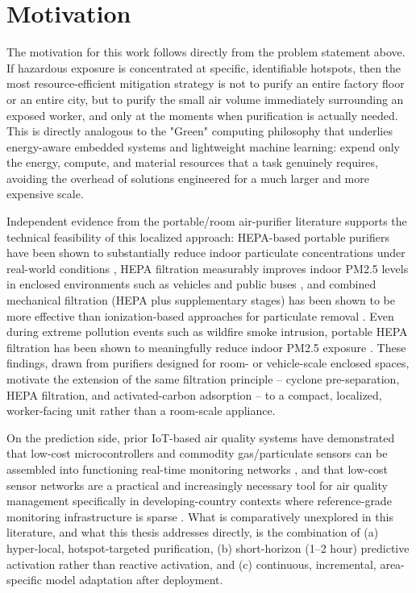 \section{Motivation}
\label{sec:motivation}

The motivation for this work follows directly from the problem statement above. If hazardous exposure is concentrated at specific, identifiable hotspots, then the most resource-efficient mitigation strategy is not to purify an entire factory floor or an entire city, but to purify the small air volume immediately surrounding an exposed worker, and only at the moments when purification is actually needed. This is directly analogous to the "Green" computing philosophy that underlies energy-aware embedded systems and lightweight machine learning: expend only the energy, compute, and material resources that a task genuinely requires, avoiding the overhead of solutions engineered for a much larger and more expensive scale.

Independent evidence from the portable/room air-purifier literature supports the technical feasibility of this localized approach: HEPA-based portable purifiers have been shown to substantially reduce indoor particulate concentrations under real-world conditions \citep{lu2023realworld,cox2018effectiveness}, HEPA filtration measurably improves indoor PM2.5 levels in enclosed environments such as vehicles and public buses \citep{lee2022effect,chen2022efficacy}, and combined mechanical filtration (HEPA plus supplementary stages) has been shown to be more effective than ionization-based approaches for particulate removal \citep{dubey2021assessing,szczotko2022review}. Even during extreme pollution events such as wildfire smoke intrusion, portable HEPA filtration has been shown to meaningfully reduce indoor PM2.5 exposure \citep{chen2025fine}. These findings, drawn from purifiers designed for room- or vehicle-scale enclosed spaces, motivate the extension of the same filtration principle -- cyclone pre-separation, HEPA filtration, and activated-carbon adsorption -- to a compact, localized, worker-facing unit rather than a room-scale appliance.

On the prediction side, prior IoT-based air quality systems have demonstrated that low-cost microcontrollers and commodity gas/particulate sensors can be assembled into functioning real-time monitoring networks \citep{alam2025iot,zhang2020realtime,kataria2022aiiot,mani2021aipowered}, and that low-cost sensor networks are a practical and increasingly necessary tool for air quality management specifically in developing-country contexts where reference-grade monitoring infrastructure is sparse \citep{shabbir2025paradigm}. What is comparatively unexplored in this literature, and what this thesis addresses directly, is the combination of (a) hyper-local, hotspot-targeted purification, (b) short-horizon (1--2 hour) predictive activation rather than reactive activation, and (c) continuous, incremental, area-specific model adaptation after deployment.

